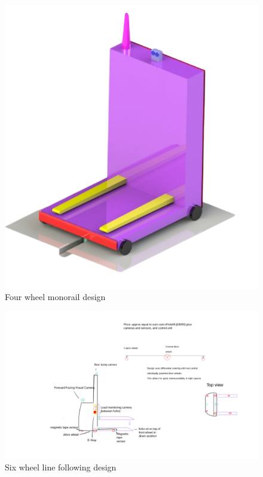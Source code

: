 \documentclass[12pt]{article}
\begin{document}
\begin{enumerate}
\begin{figure}[h!]
\begin{minipage}{0.48\textwidth}
        \includegraphics[width=\textwidth]{anna&will's design (1).png}
        \caption{Four wheel monorail design}
        \label{fig:design_idea}
    \end{minipage}
\end{figure}

\begin{figure}[h!]
    \centering
    \begin{minipage}{0.48\textwidth}

        \includegraphics[width=1\textwidth]{Louis's design.png}
        \caption{Six wheel line following design}
        \label{fig:louis_design}
    \end{minipage}
    \hfill
    \begin{minipage}{0.48\textwidth}
      

\end{minipage}
\end{figure}
\end{enumerate}
\end{document}
